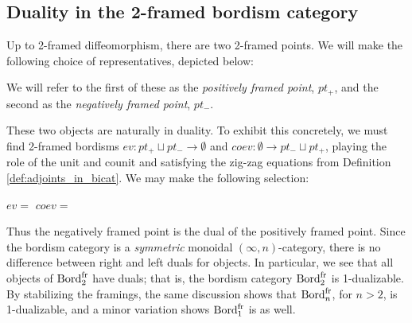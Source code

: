 \documentclass{amsart}
\begin{document}
\subsection{Duality in the 2-framed bordism category}\label{sec:framed-duality}

Up to 2-framed diffeomorphism, there are two 2-framed points. We will make the following choice of representatives, depicted below:
\begin{center}
 \hspace{1.5cm}
\end{center}
We will refer to the first of these as the {\em positively framed point}, $pt_+$, and the second as the {\em negatively framed point}, $pt_-$.  

These two objects are naturally in duality. To exhibit this concretely, we must find 2-framed bordisms $ev: pt_+ \sqcup pt_- \to \emptyset$ and $coev: \emptyset \to pt_- \sqcup pt_+$, playing the role of the unit and counit and satisfying the zig-zag equations from Definition \ref{def:adjoints_in_bicat}. We may make the following selection:
\begin{center}
	$ev =$
	\hspace{1.5cm}
	$coev =$ 
\end{center}
Thus the negatively framed point is the dual of the positively framed point. Since the bordism category is a {\em symmetric} monoidal $(\infty,n)$-category, there is no difference between right and left duals for objects.  In particular, we see that all objects of $\mathrm{Bord}^\mathrm{fr}_2$ have duals; that is, the bordism category $\mathrm{Bord}^\mathrm{fr}_2$ is 1-dualizable.  By stabilizing the framings, the same discussion shows that $\mathrm{Bord}^\mathrm{fr}_n$, for $n > 2$, is 1-dualizable, and a minor variation shows $\mathrm{Bord}^\mathrm{fr}_1$ is as well.
\end{document}
